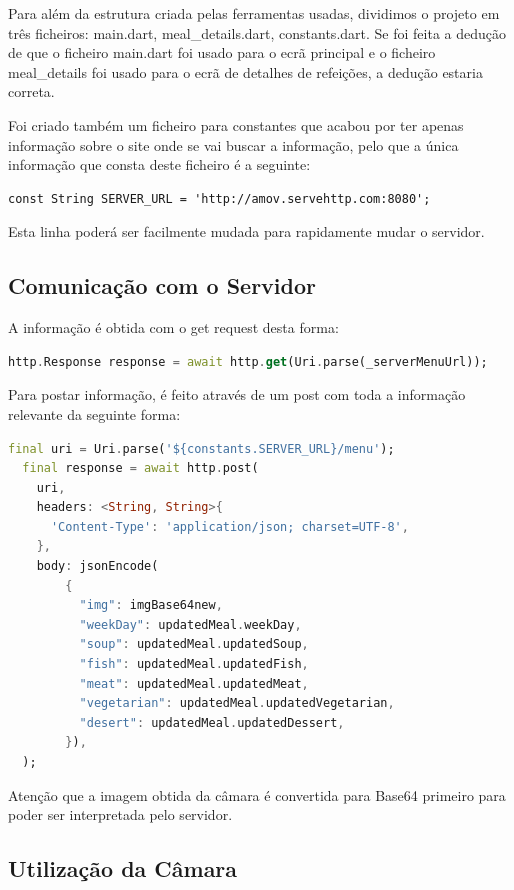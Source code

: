 \documentclass[10pt]{article}
\begin{document}
        Para além da estrutura criada pelas ferramentas usadas, dividimos o projeto em três ficheiros: main.dart, meal\_details.dart, constants.dart. Se foi feita a dedução de que o ficheiro main.dart foi usado para o ecrã principal e o ficheiro meal\_details foi usado para o ecrã de detalhes de refeições, a dedução estaria correta.

        Foi criado também um ficheiro para constantes que acabou por ter apenas informação sobre o site onde se vai buscar a informação, pelo que a única informação que consta deste ficheiro é a seguinte:
        \begin{lstlisting}
const String SERVER_URL = 'http://amov.servehttp.com:8080';
        \end{lstlisting}
        Esta linha poderá ser facilmente mudada para rapidamente mudar o servidor.

 
	\subsection{Comunicação com o Servidor}

        A informação é obtida com o get request desta forma:

        \begin{lstlisting}[language=Dart]
http.Response response = await http.get(Uri.parse(_serverMenuUrl));
        \end{lstlisting}

        Para postar informação, é feito através de um post com toda a informação relevante da seguinte forma:

        \begin{lstlisting}[language=Dart]
  final uri = Uri.parse('${constants.SERVER_URL}/menu');
  final response = await http.post(
    uri,
    headers: <String, String>{
      'Content-Type': 'application/json; charset=UTF-8',
    },
    body: jsonEncode(
        {
          "img": imgBase64new,
          "weekDay": updatedMeal.weekDay,
          "soup": updatedMeal.updatedSoup,
          "fish": updatedMeal.updatedFish,
          "meat": updatedMeal.updatedMeat,
          "vegetarian": updatedMeal.updatedVegetarian,
          "desert": updatedMeal.updatedDessert,
        }),
  );
        \end{lstlisting}

        Atenção que a imagem obtida da câmara é convertida para Base64 primeiro para poder ser interpretada pelo servidor.

        \subsection{Utilização da Câmara}
\end{document}
